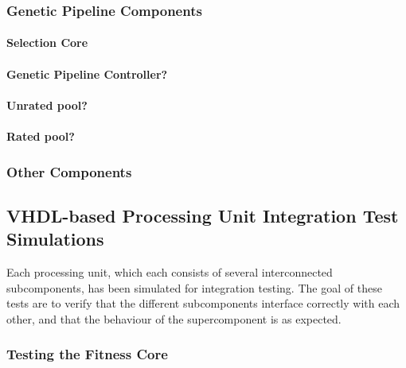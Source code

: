 \subsubsection{Genetic Pipeline Components}
\paragraph{Selection Core}
\paragraph{Genetic Pipeline Controller?}
\paragraph{Unrated pool?}
\paragraph{Rated pool?}








\subsubsection{Other Components}

\subsection{\gls{VHDL}-based Processing Unit Integration Test Simulations}

Each processing unit, which each consists of several interconnected subcomponents, has been simulated for integration testing.
The goal of these tests are to verify that the different subcomponents interface correctly with each other, and that the behaviour of the supercomponent is as expected.

\subsubsection{Testing the Fitness Core}


